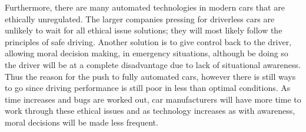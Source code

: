 \documentclass{article}[12pt]
\begin{document}
Furthermore, there are many automated technologies in modern cars that are ethically unregulated.
The larger companies pressing for driverless cars are unlikely to wait for all ethical issue solutions; they will most likely follow the principles of safe driving.
Another solution is to give control back to the driver, allowing moral decision making, in emergency situations, although be doing so the driver will be at a complete disadvantage due to lack of situational awareness.
Thus the reason for the push to fully automated cars, however there is still ways to go since driving performance is still poor in less than optimal conditions.
As time increases and bugs are worked out, car manufacturers will have more time to work through these ethical issues and as technology increases as with awareness, moral decisions will be made less frequent.
\end{document}
